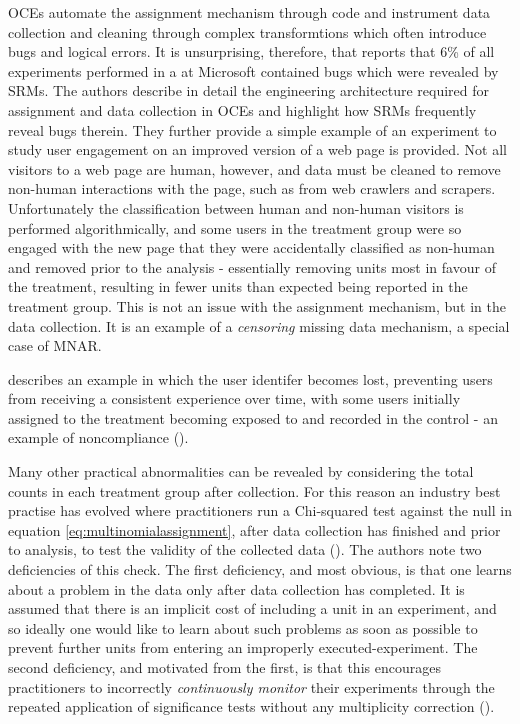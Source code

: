 \documentclass[11pt]{article}
\begin{document}
OCEs automate the assignment mechanism through code and instrument data collection and cleaning through complex transformtions which often introduce bugs and logical errors. It is unsurprising, therefore, that \cite{fabijan} reports that 6\% of all experiments performed in a at Microsoft contained bugs which were revealed by SRMs. The authors describe in detail the engineering architecture required for assignment and data collection in OCEs and highlight how SRMs frequently reveal bugs therein. They further provide a simple example of an experiment to study user engagement on an improved version of a web page is provided. Not all visitors to a web page are human, however, and data must be cleaned to remove non-human interactions with the page, such as from web crawlers and scrapers. Unfortunately the classification between human and non-human visitors is performed algorithmically, and some users in the treatment group were so engaged with the new page that they were accidentally classified as non-human and removed prior to the analysis - essentially removing units most in favour of the treatment, resulting in fewer units than expected being reported in the treatment group. This is not an issue with the assignment mechanism, but in the data collection. It is an example of a \textit{censoring} missing data mechanism, a special case of MNAR.

\cite{zhao} describes an example in which the user identifer becomes lost, preventing users from receiving a consistent experience over time, with some users initially assigned to the treatment becoming exposed to and recorded in the control - an example of noncompliance (\cite{imbens}). 

Many other practical abnormalities can be revealed by considering the total counts in each treatment group after collection. For this reason an industry best practise has evolved where practitioners run a Chi-squared test against the null in equation \eqref{eq:multinomialassignment}, after data collection has finished and prior to analysis, to test the validity of the collected data (\cite{linkedin}).
The authors note two deficiencies of this check. The first deficiency, and most obvious, is that one learns about a problem in the data only after data collection has completed. It is assumed that there is an implicit cost of including a unit in an experiment, and so ideally one would like to learn about such problems as soon as possible to prevent further units from entering an improperly executed-experiment. The second deficiency, and motivated from the first, is that this encourages practitioners to incorrectly \textit{continuously monitor} their experiments through the repeated application of significance tests without any multiplicity correction (\cite{armitage}).
\end{document}
